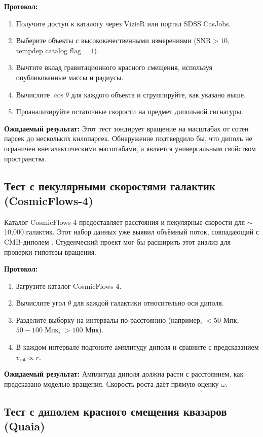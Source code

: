 \documentclass[11pt,a4paper]{article}
\begin{document}
	\textbf{Протокол:}
	\begin{enumerate}
		\item Получите доступ к каталогу через VizieR или портал SDSS CasJobs.
		\item Выберите объекты с высококачественными измерениями (\(\mathrm{SNR} > 10\), \(\mathrm{tempdep\_catalog\_flag} = 1\)).
		\item Вычтите вклад гравитационного красного смещения, используя опубликованные массы и радиусы.
		\item Вычислите \(\cos\theta\) для каждого объекта и сгруппируйте, как указано выше.
		\item Проанализируйте остаточные скорости на предмет дипольной сигнатуры.
	\end{enumerate}
	
	\textbf{Ожидаемый результат:} Этот тест зондирует вращение на масштабах от сотен парсек до нескольких килопарсек. Обнаружение подтвердило бы, что диполь не ограничен внегалактическими масштабами, а является универсальным свойством пространства.
	
	\subsection{Тест с пекулярными скоростями галактик (CosmicFlows-4)}
	
	Каталог CosmicFlows-4 предоставляет расстояния и пекулярные скорости для \(\sim\)10,000 галактик. Этот набор данных уже выявил объёмный поток, совпадающий с CMB-диполем \cite{Watkins2023}. Студенческий проект мог бы расширить этот анализ для проверки гипотезы вращения.
	
	\textbf{Протокол:}
	\begin{enumerate}
		\item Загрузите каталог CosmicFlows-4.
		\item Вычислите угол \(\theta\) для каждой галактики относительно оси диполя.
		\item Разделите выборку на интервалы по расстоянию (например, \(<50\) Мпк, \(50-100\) Мпк, \(>100\) Мпк).
		\item В каждом интервале подгоните амплитуду диполя и сравните с предсказанием \(v_{\mathrm{rot}} \propto r\).
	\end{enumerate}
	
	\textbf{Ожидаемый результат:} Амплитуда диполя должна расти с расстоянием, как предсказано моделью вращения. Скорость роста даёт прямую оценку \(\omega\).
	
	\subsection{Тест с диполем красного смещения квазаров (Quaia)}
	
\end{document}
